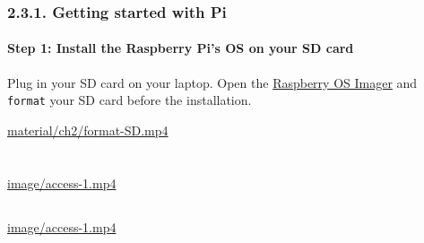 \documentclass[
  letterpaper,
  DIV=11,
  numbers=noendperiod]{scrreprt}
\begin{document}

\hypertarget{getting-started-with-pi}{%
\section*{2.3.1. Getting started with
Pi}\label{getting-started-with-pi}}


\hypertarget{step-1-install-the-raspberry-pis-os-on-your-sd-card}{%
\subsection*{Step 1: Install the Raspberry Pi's OS on your SD
card}\label{step-1-install-the-raspberry-pis-os-on-your-sd-card}}

Plug in your SD card on your laptop. Open the
\href{https://www.raspberrypi.com/software/}{Raspberry OS Imager} and
\texttt{format} your SD card before the installation.

\url{material/ch2/format-SD.mp4}

\part{}

\hypertarget{section-2}{%
\chapter{}\label{section-2}}

\part{}

\hypertarget{section-4}{%
\chapter{}\label{section-4}}

\part{}

\hypertarget{section-6}{%
\chapter{}\label{section-6}}

\part{}

\url{image/access-1.mp4}

\hypertarget{section-8}{%
\chapter{}\label{section-8}}

\url{image/access-1.mp4}
\end{document}
